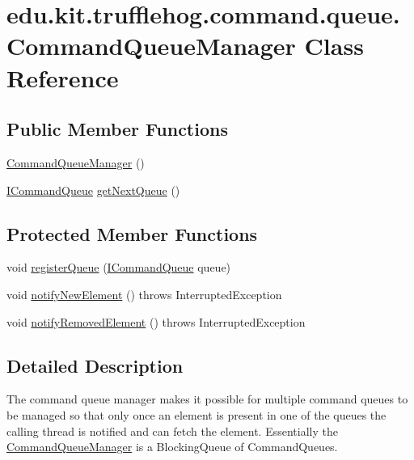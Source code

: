 \hypertarget{classedu_1_1kit_1_1trufflehog_1_1command_1_1queue_1_1_command_queue_manager}{}\section{edu.\+kit.\+trufflehog.\+command.\+queue.\+Command\+Queue\+Manager Class Reference}
\label{classedu_1_1kit_1_1trufflehog_1_1command_1_1queue_1_1_command_queue_manager}
\subsection*{Public Member Functions}
\begin{DoxyCompactItemize}
\item 
\hyperlink{classedu_1_1kit_1_1trufflehog_1_1command_1_1queue_1_1_command_queue_manager_a30e1f24537977773a3e63e7da9caea36}{Command\+Queue\+Manager} ()
\item 
\hyperlink{interfaceedu_1_1kit_1_1trufflehog_1_1command_1_1queue_1_1_i_command_queue}{I\+Command\+Queue} \hyperlink{classedu_1_1kit_1_1trufflehog_1_1command_1_1queue_1_1_command_queue_manager_ab2d3dd74a53b8a012260d8c29bb35772}{get\+Next\+Queue} ()
\end{DoxyCompactItemize}
\subsection*{Protected Member Functions}
\begin{DoxyCompactItemize}
\item 
void \hyperlink{classedu_1_1kit_1_1trufflehog_1_1command_1_1queue_1_1_command_queue_manager_aa53bc947ab4e03a9c0c59fb6f0e4ebc8}{register\+Queue} (\hyperlink{interfaceedu_1_1kit_1_1trufflehog_1_1command_1_1queue_1_1_i_command_queue}{I\+Command\+Queue} queue)
\item 
void \hyperlink{classedu_1_1kit_1_1trufflehog_1_1command_1_1queue_1_1_command_queue_manager_ac230c474e3af5968872ab96afea64c83}{notify\+New\+Element} ()  throws Interrupted\+Exception 
\item 
void \hyperlink{classedu_1_1kit_1_1trufflehog_1_1command_1_1queue_1_1_command_queue_manager_afadc515ae2540edf379193155f3f6dad}{notify\+Removed\+Element} ()  throws Interrupted\+Exception 
\end{DoxyCompactItemize}


\subsection{Detailed Description}
The command queue manager makes it possible for multiple command queues to be managed so that only once an element is present in one of the queues the calling thread is notified and can fetch the element. Essentially the \hyperlink{classedu_1_1kit_1_1trufflehog_1_1command_1_1queue_1_1_command_queue_manager}{Command\+Queue\+Manager} is a Blocking\+Queue of Command\+Queues. 


